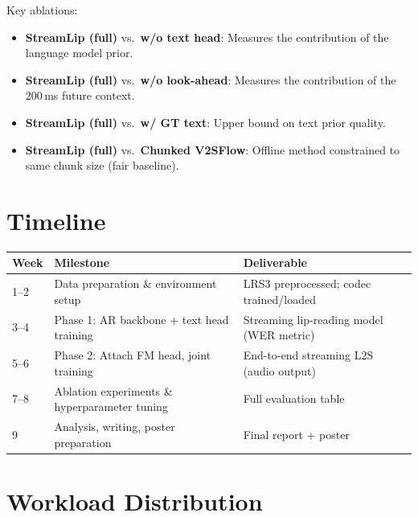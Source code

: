 \documentclass{article}
\begin{document}
Key ablations:
\begin{itemize}
    \item \textbf{StreamLip (full)} vs.\ \textbf{w/o text head}: Measures the contribution of the language model prior.
    \item \textbf{StreamLip (full)} vs.\ \textbf{w/o look-ahead}: Measures the contribution of the 200\,ms future context.
    \item \textbf{StreamLip (full)} vs.\ \textbf{w/ GT text}: Upper bound on text prior quality.
    \item \textbf{StreamLip (full)} vs.\ \textbf{Chunked V2SFlow}: Offline method constrained to same chunk size (fair baseline).
\end{itemize}

\section{Timeline}

\begin{table}[h]
\centering
\small
\begin{tabular}{@{}lll@{}}
\toprule
\textbf{Week} & \textbf{Milestone} & \textbf{Deliverable} \\
\midrule
1--2 & Data preparation \& environment setup & LRS3 preprocessed; codec trained/loaded \\
3--4 & Phase 1: AR backbone + text head training & Streaming lip-reading model (WER metric) \\
5--6 & Phase 2: Attach FM head, joint training & End-to-end streaming L2S (audio output) \\
7--8 & Ablation experiments \& hyperparameter tuning & Full evaluation table \\
9    & Analysis, writing, poster preparation & Final report + poster \\
\bottomrule
\end{tabular}
\end{table}

\section{Workload Distribution}
\end{document}
